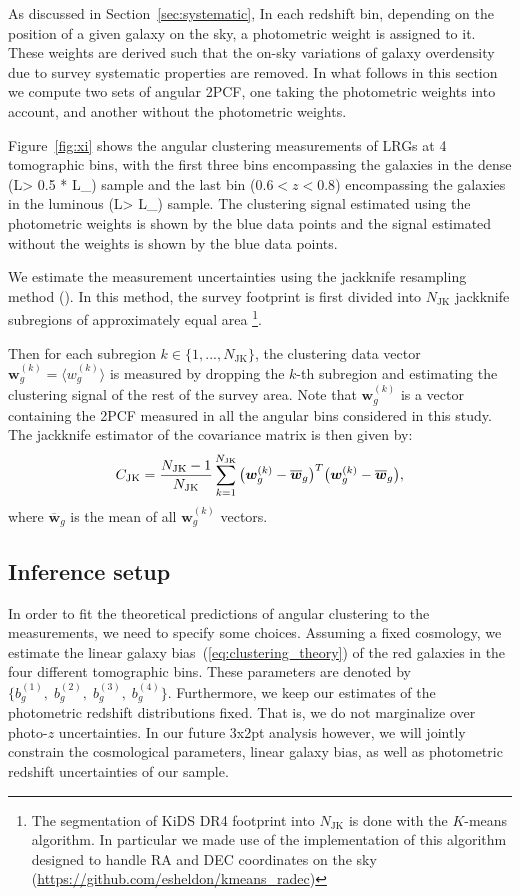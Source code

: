 \documentclass[fleqn,usenatbib,useAMS]{mnras}
\newcommand{\be}{\begin{equation}}
\newcommand{\ee}{\end{equation}}
\newcommand{\dk}{\boldsymbol{w}_{g}^{(k)}}
\newcommand{\dbar}{\overline{\boldsymbol{w}}_{g}}
\newcommand{\njk}{N_{\rm JK}}
\begin{document}
As discussed in Section~\ref{sec:systematic}, In each redshift bin, depending on the position of a given galaxy on the sky, a photometric weight is assigned to it. These weights are derived such that the on-sky variations of galaxy overdensity due to survey systematic properties are removed. In what follows in this section we compute two sets of angular 2PCF, one taking the photometric weights into account, and another without the photometric weights. 

Figure~\ref{fig:xi} shows the angular clustering measurements of LRGs at 4 tomographic bins, with the first three bins encompassing the galaxies in the dense (L> 0.5 * L_{\star}) sample and the last bin ($0.6<z<0.8$) encompassing the galaxies in the luminous (L> L_{\star}) sample. The clustering signal estimated using the photometric weights is shown by the blue data points and the signal estimated without the weights is shown by the blue data points. 

We estimate the measurement uncertainties using the jackknife resampling method (\citealt{norberg2009,oliver2016,singh2017,shirasaki2017}). 
In this method, the survey footprint is first divided into $N_{\mathrm{JK}}$ jackknife subregions of approximately equal area \footnote{The segmentation of KiDS DR4 footprint into $N_{\mathrm{JK}}$ is done with the $K$-means algorithm. In particular we made use of the implementation of this algorithm designed to handle RA and DEC coordinates on the sky (\hyperlink{kmeans\_radec}{https://github.com/esheldon/kmeans\_radec})}.

Then for each subregion $k\in\{1,...,N_{\mathrm{JK}}\}$, the clustering data vector $\boldsymbol{w}_{g}^{(k)} = \langle w^{(k)}_{g}\rangle$ is measured by dropping the $k$-th subregion and estimating the clustering signal of the rest of the survey area. Note that $\boldsymbol{w}_{g}^{(k)}$ is a vector containing the 2PCF measured in all the angular bins considered in this study. The jackknife estimator of the covariance matrix is then given by:
\be 
C_{\rm JK} = \frac{\njk - 1}{\njk}\sum_{k=1}^{\njk}\big(\dk-\dbar\big)^{T}\big(\dk-\dbar\big), 
\label{eq:jk}
\ee
where $\dbar$ is the mean of all $\boldsymbol{w}_{g}^{(k)}$ vectors. 

\subsection{Inference setup}

In order to fit the theoretical predictions of angular clustering to the measurements, we need to specify some choices. Assuming a fixed cosmology, we estimate the linear galaxy bias~(\ref{eq:clustering_theory}) of the red galaxies in the four different tomographic bins. These parameters are denoted by $\{b^{(1)}_g, \; b^{(2)}_g, \; b^{(3)}_g, \; b^{(4)}_g\}$. Furthermore, we keep our estimates of the photometric redshift distributions fixed. That is, we do not marginalize over photo-$z$ uncertainties. In our future 3x2pt analysis however, we will jointly constrain the cosmological parameters, linear galaxy bias, as well as photometric redshift uncertainties of our sample. 
\end{document}

